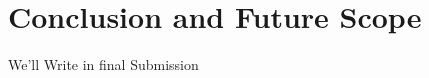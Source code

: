 \documentclass[12pt,letterpaper]{article}
\begin{document}
        \section{Conclusion and Future Scope}

            We'll Write in final Submission

\clearpage
\newpage
{}
    \printbibliography

    

\end{document}

